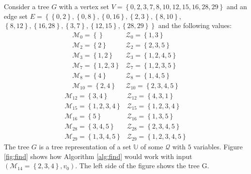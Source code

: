 Consider a tree $G$ with a vertex set
$V=\left\{0,2,3,7,8,10,12,15,16,28,29\right\}$
and an edge set
$E = \left\{\left\{0,2\right\}, \left\{0,8\right\}, \left\{0,16\right\},
\left\{2,3\right\}, \left\{8,10\right\}\right.$, $\left.\left\{8,12\right\},
\left\{16,28\right\}, \left\{3,7\right\}, \left\{12,15\right\},
\left\{28,29\right\}\right\}$
and the following values:
\[
    \begin{array}{ll}
        \mathcal{M}_0    = \left\{{}\right\}           & \mathcal{Z}_0    = \left\{{1,3}\right\} \\
        \mathcal{M}_2    = \left\{{2}\right\}          & \mathcal{Z}_2    = \left\{{2,3,5}\right\} \\
        \mathcal{M}_3    = \left\{{1,2}\right\}        & \mathcal{Z}_3    = \left\{{1,2,4,5}\right\} \\
        \mathcal{M}_7    = \left\{{1,2,3}\right\}      & \mathcal{Z}_7    = \left\{{1,2,3,5}\right\} \\
        \mathcal{M}_8    = \left\{{4}\right\}          & \mathcal{Z}_8    = \left\{{1,4,5}\right\} \\
        \mathcal{M}_{10} = \left\{{2,4}\right\}        & \mathcal{Z}_{10} = \left\{{2,3,4,5}\right\}
    \end{array}
\]
\[
    \begin{array}{ll}
        \mathcal{M}_{12} = \left\{{3,4}\right\}        & \mathcal{Z}_{12} = \left\{{4,3,1}\right\} \\
        \mathcal{M}_{15} = \left\{{1,2,3,4}\right\}    & \mathcal{Z}_{15} = \left\{{1,2,3,4}\right\} \\
        \mathcal{M}_{16} = \left\{{5}\right\}          & \mathcal{Z}_{16} = \left\{{1,3,5}\right\} \\
        \mathcal{M}_{28} = \left\{{3,4,5}\right\}      & \mathcal{Z}_{28} = \left\{{2,3,4,5}\right\} \\
        \mathcal{M}_{29} = \left\{{1,3,4,5}\right\}    & \mathcal{Z}_{29} = \left\{{1,2,3,4,5}\right\}
    \end{array}
\]
The tree $G$ is a tree representation of a set $\mathbb{U}$ of some
$\mathcal{Q}$ with $5$ variables.
Figure \ref{fig:find} shows how Algorithm \ref{alg:find} would work with input
$(\mathcal{M}_{14} = \left\{{2,3,4}\right\}, v_0)$.
The left side of the figure shows the tree G.

